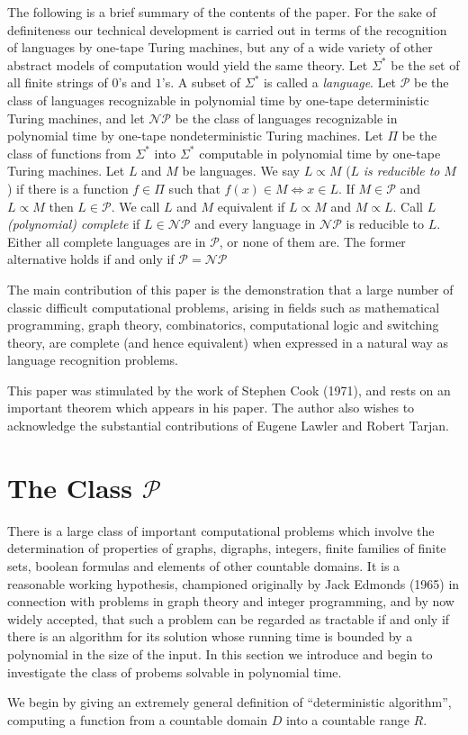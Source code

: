 \documentclass{scrartcl}
\begin{document}
The following is a brief summary of the contents of the paper. For the sake of definiteness our technical development is carried out in terms
of the recognition of languages by one-tape Turing machines, but any of a wide variety of other abstract models of computation would yield the
same theory. Let \(\Sigma^{*}\) be the set of all finite strings of \(0\)'s and \(1\)'s. A subset of \(\Sigma^{*}\) is called a \emph{language}.
Let \(\mathcal{P}\) be the class of languages recognizable in polynomial time by one-tape deterministic Turing machines, and let \(\mathcal{NP}\)
be the class of languages recognizable in polynomial time by one-tape nondeterministic Turing machines. Let \(\Pi\) be the class of functions from
\(\Sigma^{*}\) into \(\Sigma^{*}\) computable in polynomial time by one-tape Turing machines. Let \(L\) and \(M\) be languages. We say \(L \propto M\)
(\(L\) \emph{is reducible to} \(M\)) if there is a function \(f \in \Pi\) such that \(f(x) \in M \Leftrightarrow x \in L\). If \(M \in \mathcal{P}\)
and \(L \propto M\) then \(L \in \mathcal{P}\). We call \(L\) and \(M\) equivalent if \(L \propto M\) and \(M \propto L\). Call \(L\) \emph{(polynomial)
complete} if \(L \in \mathcal{NP}\) and every language in \(\mathcal{NP}\) is reducible to \(L\). Either all complete languages are in \(\mathcal{P}\),
or none of them are. The former alternative holds if and only if \(\mathcal{P} = \mathcal{NP}\)

The main contribution of this paper is the demonstration that a large number of classic difficult computational problems, arising in fields such
as mathematical programming, graph theory, combinatorics, computational logic and switching theory, are complete (and hence equivalent) when
expressed in a natural way as language recognition problems.

This paper was stimulated by the work of Stephen Cook (1971), and rests on an important theorem which appears in his paper.
The author also wishes to acknowledge the substantial contributions of Eugene Lawler and Robert Tarjan.

\section{The Class \(\mathcal{P}\)}

There is a large class of important computational problems which involve the determination of properties of graphs, digraphs, integers, finite families of finite
sets, boolean formulas and elements of other countable domains.
It is a reasonable working hypothesis, championed originally by Jack Edmonds (1965) in connection with problems in graph theory and integer programming, and by now
widely accepted, that such a problem can be regarded as tractable if and only if there is an algorithm for its solution whose running time is bounded by a polynomial
in the size of the input.
In this section we introduce and begin to investigate the class of probems solvable in polynomial time.

We begin by giving an extremely general definition of ``deterministic algorithm'', computing a function from a countable domain \(D\) into a countable range \(R\).
\end{document}
